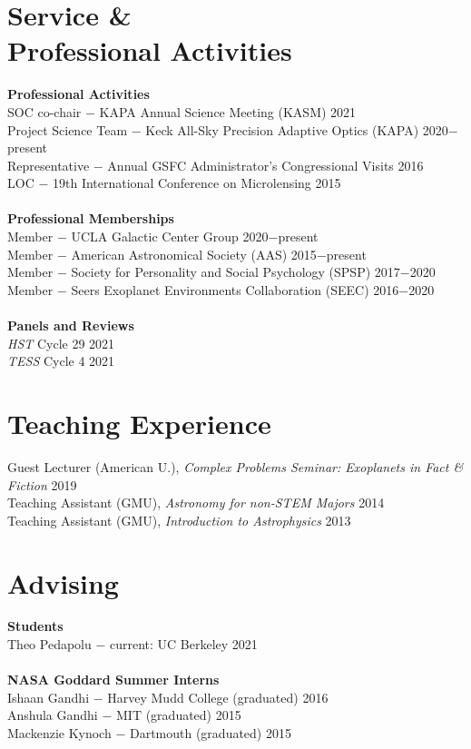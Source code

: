 \documentclass[margin,line]{cv}
\begin{document}
\begin{resume}
\section{\sc Service \&\\ Professional Activities}
\textbf{Professional Activities}\\
SOC co-chair $-$ KAPA Annual Science Meeting (KASM) \hfill 2021\\
Project Science Team $-$ Keck All-Sky Precision Adaptive Optics (KAPA) \hfill 2020$-$present\\
Representative $-$ Annual GSFC Administrator's Congressional Visits \hfill 2016\\
LOC $-$ 19th International Conference on Microlensing \hfill 2015\\
\\
\textbf{Professional Memberships}\\
Member $-$ UCLA Galactic Center Group \hfill 2020$-$present\\
Member $-$ American Astronomical Society (AAS) \hfill 2015$-$present\\
Member $-$ Society for Personality and Social Psychology (SPSP) \hfill 2017$-$2020\\
Member $-$ Seers Exoplanet Environments Collaboration (SEEC) \hfill 2016$-$2020\\
\\
\textbf{Panels and Reviews}\\
\textit{HST} Cycle 29 \hfill 2021\\
\textit{TESS} Cycle 4 \hfill 2021\\

\section{\sc Teaching Experience}
Guest Lecturer (American U.), \textit{Complex Problems Seminar: Exoplanets in Fact \& Fiction} \hfill 2019 \\
Teaching Assistant (GMU), \textit{Astronomy for non-STEM Majors} \hfill 2014 \\
Teaching Assistant (GMU), \textit{Introduction to Astrophysics} \hfill 2013 \\

\section{\sc Advising}
\textbf{Students} \\
Theo Pedapolu $-$ current: UC Berkeley \hfill 2021 \\
\\
\textbf{NASA Goddard Summer Interns} \\
Ishaan Gandhi $-$ Harvey Mudd College (graduated) \hfill 2016 \\
Anshula Gandhi $-$ MIT (graduated) \hfill 2015\\
Mackenzie Kynoch $-$ Dartmouth (graduated) \hfill 2015 \\


\end{resume}
\end{document}

